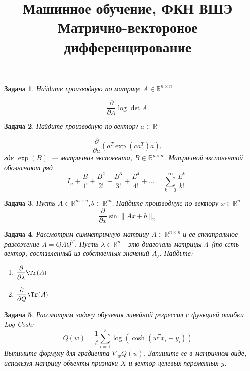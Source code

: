 \documentclass[12pt,fleqn]{article}
\title{Машинное обучение, ФКН ВШЭ\\Матрично-вектороное дифференцирование}
\author{}
\date{}
\newtheorem{esProblem}{Задача}
\begin{document}
\maketitle

\begin{esProblem}
    Найдите производную по матрице $A \in \mathbb{R}^{n\times n}$

    \begin{equation*}
        \frac{\partial}{\partial A} \log \det A.
    \end{equation*}
\end{esProblem}

\begin{esProblem}
    Найдите производную по вектору $a \in \mathbb{R}^{n}$

    \begin{equation*}
        \frac{\partial}{\partial a} \left(
            a^T \exp(a a^T)a
        \right),
    \end{equation*}
    где $\exp(B)$~--- \href{https://en.wikipedia.org/wiki/Matrix_exponential}{матричная экспонента},
    $B \in \mathbb{R}^{n \times n}$.
    Матричной экспонентой обозначают ряд
    \begin{equation*}
        I_n + \frac{B}{1!} + \frac{B^2}{2!} + \frac{B^3}{3!} + \frac{B^4}{4!} + \ldots = \sum_{k=0}^\infty \frac{B^k}{k!} .
    \end{equation*}
\end{esProblem}

\begin{esProblem}
    Пусть $A \in \mathbb{R}^{m \times n}, b \in \mathbb{R}^m$. Найдите производную по вектору $x \in \mathbb{R}^n$
    \[
    \frac{\partial}{\partial x} \sin \|Ax + b\|_2
    \]
\end{esProblem}

\begin{esProblem}
    Рассмотрим симметричную матрицу $A \in \mathbb{R}^{n \times n}$ и ее спектральное разложение $A = Q \Lambda Q^T$. Пусть $\lambda \in \mathbb{R}^n$ - это диагональ матрицы $\Lambda$ (то есть вектор, составленный из собственных значений $A$). Найдите:
    
    \begin{enumerate}
        \item $\displaystyle\frac{\partial}{\partial \lambda} \Tr(A)$
        \item $\displaystyle\frac{\partial}{\partial Q} \Tr(A)$
    \end{enumerate}
\end{esProblem}

\begin{esProblem}
    Рассмотрим задачу обучения линейной регрессии с функцией ошибки Log-Cosh:
    \[
    Q(w) = \frac{1}{\ell} \sum_{i=1}^{\ell} \log (\cosh (w^T x_i - y_i))
    \]
    Выпишите формулу для градиента $\nabla_w Q(w)$. Запишите ее в матричном виде, используя матрицу объекты-признаки $X$ и вектор целевых переменных $y$.
\end{esProblem}
\end{document}
